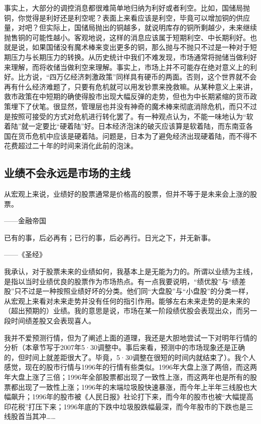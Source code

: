 事实上，大部分的调控消息都很难简单地归纳为利好或者利空。比如，国储局抛铜，你觉得是利好还是利空呢？表面上来看应该是利空，毕竟可以增加铜的供应量，对吧？但实际上，国储局抛出的铜越多，就说明库存的铜所剩越少，未来继续抛售铜的可能性越小。客观地说，这样的消息应该属于短期利空、中长期利好。也就是说，如果国储没有魔术棒来变出更多的铜，那么抛与不抛只不过是一种对于短期压力与长期压力的转换。从历史统计中我们不难发现，市场通常将抛储当做利好来理解，而将收储当做利空来理解。事实上，市场上并不可能存在绝对意义上的利好。比方说，“四万亿经济刺激政策”同样具有硬币的两面。否则，这个世界就不会再有什么经济难题了，只要有危机就可以用发钞票来挽救嘛。从某种意义上来讲，救市政策在中短期的确使得股市出现大幅反弹的走势，但也为中长期紧缩的货币政策埋下了伏笔。很显然，管理层也并没有神奇的魔术棒来彻底消除危机，而只不过是按照可接受的方式对危机进行转化罢了。有一种观点认为，不能一味地认为“软着陆”就一定要比“硬着陆”好。日本经济泡沫的破灭应该算是软着陆，而东南亚各国在货币危机中应该是硬着陆。问题是，日本为了避免经济出现硬着陆，而不得不花费超过二十年的时间来消化此前的泡沫。

\subsection{业绩不会永远是市场的主线}

{\kaishu
从宏观上来说，业绩好的股票通常是价格高的股票，但并不等于是未来会上涨的股票。

\hfill ——金融帝国

已有的事，后必再有；已行的事，后必再行。日光之下，并无新事。

\hfill ——《圣经》
}

我承认，对于股票未来的业绩如何，我基本上是无能为力的。所谓以业绩为主线，是指以当时业绩优良的股票作为市场热点。有一点我要说明，“绩优股”与“绩差股”只不过是一种按照业绩好坏的分类。他们同“大盘股”与“小盘股”的分类一样，从宏观上来看对未来走势并没有任何的指引作用。能够左右未来走势的是未来的（超出预期的）业绩。我的意思是说，市场在某一阶段绩优股会表现出众，而另一段时间绩差股又会表现喜人。

我并不爱预测行情，但为了阐述上面的道理，我还是大胆地尝试一下对明年行情的分析（本章节写于2007年5·30调整中。事后来看，预测中的市场现象还是正确的，但时间上就差距很大了。毕竟，5·30调整在很短的时间内就结束了）。我个人感觉，现在的股市行情与1996年的行情有些类似。1996年大盘上涨了两倍，而这两年大盘上涨了三倍；1996年全部股票都出现了一致性上涨，而这两年也是所有的股票都出现了一致性上涨；1996年的末端垃圾股快速暴涨，而今年上半年三线股也大幅飙升；1996年的股市被《人民日报》社论打下来，而今年的股市也被“大幅提高印花税”打压下来；1996年底的下跌中垃圾股跌幅最深，而今年股市的下跌也是三线股首当其冲……

